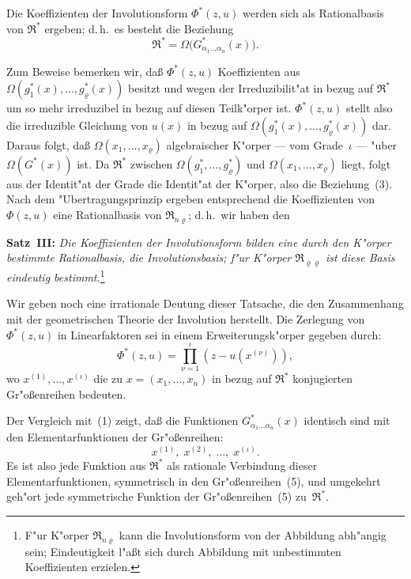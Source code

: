 \documentclass[11pt,a4paper]{article}
\begin{document}
Die Koeffizienten der Involutionsform $\Phi^{*}(z,u)$ werden sich als
Rationalbasis von $\mathfrak{R}^{*}$ ergeben; d.\,h.\ es besteht die Beziehung
\begin{equation}
\mathfrak{R}^{*}=\Omega\bigl(G_{\alpha_{1}\dots\alpha_{n}}^{*}(x)\bigr).
\tag{3}
\end{equation}

Zum Beweise bemerken wir, da\ss{} $\Phi^{*}(z,u)$ Koeffizienten aus
$\Omega(g_{1}^{*}(x),\dots,g_{\varrho}^{*}(x))$ besitzt und wegen der Irreduzibilit"{a}t in bezug
auf $\mathfrak{R}^{*}$ um so mehr irreduzibel in bezug auf diesen Teilk"{o}rper ist.
$\Phi^{*}(z,u)$ stellt also die irreduzible Gleichung von $u(x)$ in bezug auf
$\Omega(g_{1}^{*}(x),\dots,g_{\varrho}^{*}(x))$ dar. Daraus folgt, da\ss{} $\Omega(x_{1},\dots,x_{\varrho})$
algebraischer K"{o}rper --- vom Grade~$\iota$ --- "{u}ber $\Omega(G^{*}(x))$ ist. Da $\mathfrak{R}^{*}$
zwischen $\Omega(g_{1}^{*},\dots,g_{\varrho}^{*})$ und $\Omega(x_{1},\dots,x_{\varrho})$ liegt, folgt aus der
Identit"{a}t der Grade die Identit"{a}t der K"{o}rper, also die Beziehung~(3).
Nach dem "{U}bertragungsprinzip ergeben entsprechend die Koeffizienten von
$\Phi(z,u)$ eine Rationalbasis von $\mathfrak{R}_{n\varrho}$; d.\,h.\ wir haben den

\medskip
\noindent
\textbf{Satz~III:} \emph{Die Koeffizienten der Involutionsform bilden eine
durch den K"{o}rper bestimmte Rationalbasis, die \emph{Involutionsbasis}; f"{u}r
K"{o}rper $\mathfrak{R}_{\varrho\varrho}$ ist diese Basis eindeutig bestimmt.}\footnote{F"{u}r K"{o}rper $\mathfrak{R}_{n\varrho}$
kann die Involutionsform von der Abbildung abh"{a}ngig sein; Eindeutigkeit
l"{a}\ss{}t sich durch Abbildung mit unbestimmten Koeffizienten erzielen.}

Wir geben noch eine irrationale Deutung dieser Tatsache, die den
Zusammenhang mit der geometrischen Theorie der Involution herstellt.
Die Zerlegung von $\Phi^{*}(z,u)$ in Linearfaktoren sei in einem Erweiterungsk"{o}rper
gegeben durch:
\begin{equation}
\Phi^{*}(z,u)=\prod_{\nu=1}^{\iota}(z-u(x^{(\nu)})),
\tag{4}
\end{equation}
wo $x^{(1)},\dots,x^{(\iota)}$ die zu $x=(x_{1},\dots,x_{n})$ in bezug auf $\mathfrak{R}^{*}$ konjugierten
Gr"{o}\ss{}enreihen bedeuten.

Der Vergleich mit~(1) zeigt, da\ss{} die Funktionen $G_{\alpha_{1}\dots\alpha_{n}}^{*}(x)$
identisch sind mit den Elementarfunktionen der Gr"{o}\ss{}enreihen:
\begin{equation}
x^{(1)},\;x^{(2)},\;\dots,\;x^{(\iota)}.
\tag{5}
\end{equation}
Es ist also jede Funktion aus $\mathfrak{R}^{*}$ als rationale Verbindung dieser
Elementarfunktionen, symmetrisch in den Gr"{o}\ss{}enreihen~(5), und umgekehrt
geh"{o}rt jede symmetrische Funktion der Gr"{o}\ss{}enreihen~(5) zu~$\mathfrak{R}^{*}$.
\end{document}
